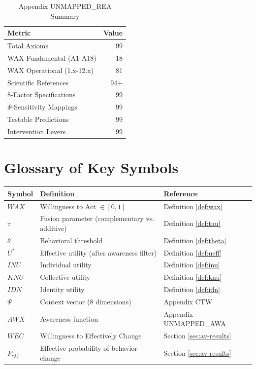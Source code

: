 \begin{table}[htbp]
\centering
\caption{Appendix UNMAPPED_REA Summary}
\label{tab:av-summary}
\renewcommand{\arraystretch}{1.3}
\begin{tabular}{@{}lr@{}}
\toprule
\textbf{Metric} & \textbf{Value} \\
\midrule
Total Axioms & 99 \\
\quad WAX Fundamental (A1-A18) & 18 \\
\quad WAX Operational (1.x-12.x) & 81 \\
Scientific References & 94+ \\
8-Factor Specifications & 99 \\
$\Psi$-Sensitivity Mappings & 99 \\
Testable Predictions & 99 \\
Intervention Levers & 99 \\
\bottomrule
\end{tabular}
\end{table}



\section{Glossary of Key Symbols}
\label{sec:av-glossary}

\begin{center}
\renewcommand{\arraystretch}{1.3}
\begin{tabular}{@{}lll@{}}
\toprule
\textbf{Symbol} & \textbf{Definition} & \textbf{Reference} \\
\midrule
$WAX$ & Willingness to Act $\in [0,1]$ & Definition \ref{def:wax} \\
$\tau$ & Fusion parameter (complementary vs. additive) & Definition \ref{def:tau} \\
$\theta$ & Behavioral threshold & Definition \ref{def:theta} \\
$U^*$ & Effective utility (after awareness filter) & Definition \ref{def:ueff} \\
$INU$ & Individual utility & Definition \ref{def:inu} \\
$KNU$ & Collective utility & Definition \ref{def:knu} \\
$IDN$ & Identity utility & Definition \ref{def:idn} \\
$\Psi$ & Context vector (8 dimensions) & Appendix CTW \\
$AWX$ & Awareness function & Appendix UNMAPPED_AWA \\
$WEC$ & Willingness to Effectively Change & Section \ref{sec:av-results} \\
$P_{eff}$ & Effective probability of behavior change & Section \ref{sec:av-results} \\
\bottomrule
\end{tabular}
\end{center}

